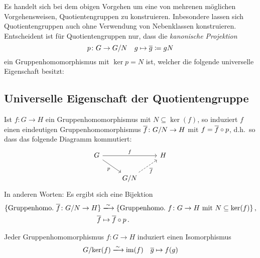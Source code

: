 \begin{remark}
  Es handelt sich bei dem obigen Vorgehen um eine von mehrenen möglichen Vorgehensweisen, Quotientengruppen zu konstruieren.
  Inbesondere lassen sich Quotientengruppen auch ohne Verwendung von Nebenklassen konstruieren.
  Entscheident ist für Quotientengruppen nur, dass die \emph{kanonische Projektion}
  \[
              p
    \colon    G
    \to       G/N
    \quad     g
    \mapsto   \overline{g}
    \coloneqq  gN
  \]
  ein Gruppenhomomorphismus mit $\ker p = N$ ist, welcher die folgende universelle Eigenschaft besitzt:
\end{remark}



\subsection{Universelle Eigenschaft der Quotientengruppe}

\begin{theorem}
  Ist $f \colon G \to H$ ein Gruppenhomomorphismus mit $N \subseteq \ker(f)$, so induziert $f$ einen eindeutigen Gruppenhomomorphismus $\overline{f} \colon G/N \to H$ mit $f = \overline{f} \circ p$, d.h.\ so dass das folgende Diagramm kommutiert:
  \[
    \begin{tikzcd}
        G
        \arrow{rr}[above]{f}
        \arrow{dr}[below left]{p}
      & {}
      & H
      \\
        {}
      & G/N
        \arrow[dashed]{ru}[below right]{\induced{f}}
      & {}
    \end{tikzcd}
  \]
  In anderen Worten:
  Es ergibt sich eine Bijektion
  \begin{align*}
                            \{ \text{Gruppenhomo.\ $\induced{f} \colon G/N \to H$} \}
    &\xlongrightarrow{\sim} \{ \text{Gruppenhomo.\ $f \colon G \to H$ mit $N \subseteq \ker(f)$} \} \,,  \\
                            \induced{f}
    &\mapsto                \induced{f} \circ p \,.
  \end{align*}
\end{theorem}

\begin{corollary}[1.\ Isomorphiesatz]
  Jeder Gruppenhomomorphismus $f \colon G \to H$ induziert einen Isomorphismus
  \[
                            G/{\ker(f)}
    \xlongrightarrow{\sim}  \im(f)
    \quad                   \class{g}
    \mapsto                 f(g)
  \]
\end{corollary}

